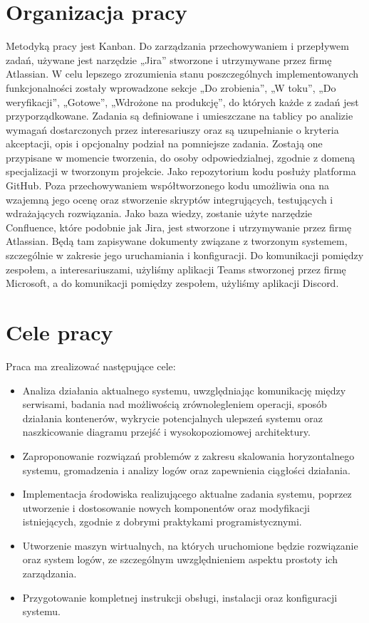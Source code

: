 \section{Organizacja pracy}
\indent Metodyką pracy jest Kanban. Do zarządzania przechowywaniem i przepływem zadań, używane jest narzędzie „Jira” stworzone i utrzymywane przez firmę Atlassian. W celu lepszego zrozumienia stanu poszczególnych implementowanych funkcjonalności zostały wprowadzone sekcje „Do zrobienia”, „W toku”, „Do weryfikacji”, „Gotowe”, „Wdrożone na produkcję”, do których każde z zadań jest przyporządkowane. Zadania są definiowane i umieszczane na tablicy po analizie wymagań dostarczonych przez interesariuszy oraz są uzupełnianie o kryteria akceptacji, opis i opcjonalny podział na pomniejsze zadania. Zostają one przypisane w momencie tworzenia, do osoby odpowiedzialnej, zgodnie z domeną specjalizacji w tworzonym projekcie.
\newline \indent Jako repozytorium kodu posłuży platforma GitHub. Poza przechowywaniem współtworzonego kodu umożliwia ona na wzajemną jego ocenę oraz stworzenie skryptów integrujących, testujących i wdrażających rozwiązania.
\newline \indent Jako baza wiedzy, zostanie użyte narzędzie Confluence, które podobnie jak Jira, jest stworzone i utrzymywanie przez firmę Atlassian. Będą tam zapisywane dokumenty związane z tworzonym systemem, szczególnie w zakresie jego uruchamiania i konfiguracji.
\newline \indent Do komunikacji pomiędzy zespołem, a interesariuszami, użyliśmy aplikacji Teams stworzonej przez firmę Microsoft, a do komunikacji pomiędzy zespołem, użyliśmy aplikacji Discord.

\section{Cele pracy}
\indent Praca ma zrealizować następujące cele:
\begin{itemize}
    \item Analiza działania aktualnego systemu, uwzględniając komunikację między serwisami, badania nad możliwością zrównolegleniem operacji, sposób działania kontenerów, wykrycie potencjalnych ulepszeń systemu oraz naszkicowanie diagramu przejść i wysokopoziomowej architektury.
    \item Zaproponowanie rozwiązań problemów z zakresu skalowania horyzontalnego systemu, gromadzenia i analizy logów oraz zapewnienia ciągłości działania.
    \item Implementacja środowiska realizującego aktualne zadania systemu, poprzez utworzenie i dostosowanie nowych komponentów oraz modyfikacji istniejących, zgodnie z dobrymi praktykami programistycznymi.
    \item Utworzenie maszyn wirtualnych, na których uruchomione będzie rozwiązanie oraz system logów, ze szczególnym uwzględnieniem aspektu prostoty ich zarządzania.
    \item Przygotowanie kompletnej instrukcji obsługi, instalacji oraz konfiguracji systemu.
\end{itemize}
